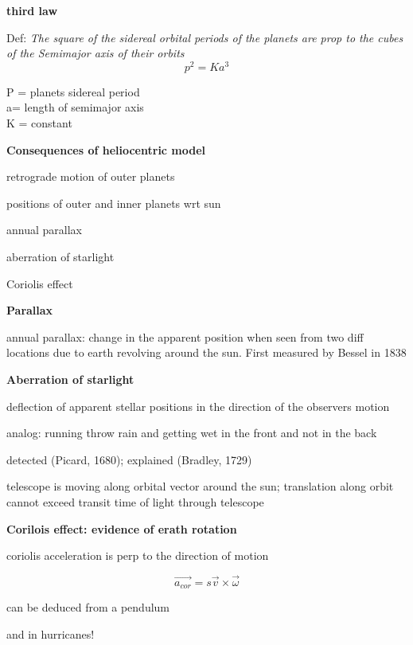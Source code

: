 \documentclass{article}
\begin{document}
\noindent \textbf{third law }

Def: \textit{The square of the sidereal orbital periods of the planets are prop to the cubes of the Semimajor axis of their orbits}
\[p^2 = Ka^3\]
\begin{center}
    P = planets sidereal period\\
    a= length of semimajor axis\\
    K = constant
\end{center}

\noindent \textbf{\large Consequences of heliocentric model}
\begin{list}{-}{}
\item retrograde motion of outer planets
\item positions of outer and inner planets wrt sun
\item annual parallax 
\item aberration of starlight
\item Coriolis effect
\end{list}

\noindent \textbf{\large Parallax}
\begin{list}{-}{}
\item annual parallax: change in the apparent position when seen from two diff locations due to earth revolving around the sun. First measured by Bessel in 1838
\end{list}

\noindent \textbf{\large Aberration of starlight}
\begin{list}{-}{}
\item deflection of apparent stellar positions in the direction of the observers motion
\item analog: running throw rain and getting wet in the front and not in the back
\item detected (Picard, 1680); explained (Bradley, 1729)
\item telescope is moving along orbital vector around the sun; translation along orbit cannot exceed transit time of light through telescope
\end{list}

\noindent \textbf{\large Corilois effect: evidence of erath rotation}
\begin{list}{-}{}
\item coriolis acceleration is perp to the direction of motion 
\item \[\vec{a_{cor}}= s\vec{v} \times \vec{\omega}\]
\item can be deduced from a pendulum
\item and in hurricanes!
\end{list}
\end{document}
